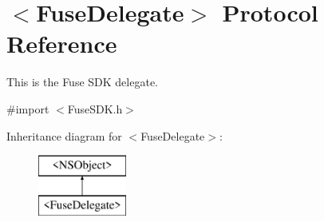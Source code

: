\hypertarget{protocol_fuse_delegate-p}{}\section{$<$Fuse\+Delegate$>$ Protocol Reference}
\label{protocol_fuse_delegate-p}


This is the Fuse S\+D\+K delegate.  




{\ttfamily \#import $<$Fuse\+S\+D\+K.\+h$>$}

Inheritance diagram for $<$Fuse\+Delegate$>$\+:\begin{figure}[H]
\begin{center}
\leavevmode
\includegraphics[height=2.000000cm]{protocol_fuse_delegate-p}
\end{center}
\end{figure}
